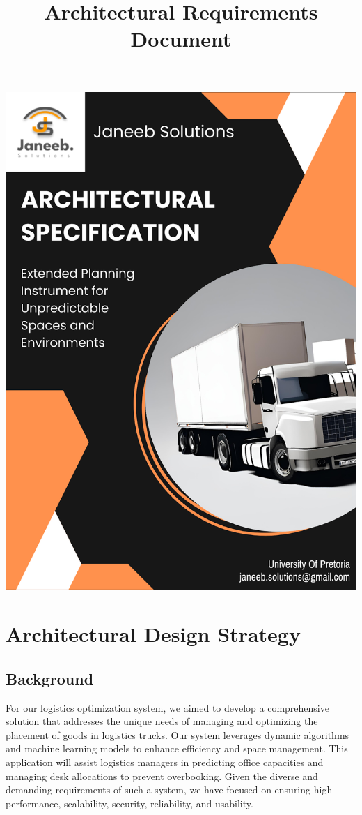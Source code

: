 \documentclass[a4paper,12pt]{article}
\title{Architectural Requirements Document}
\date{}
\begin{document}
\begin{titlepage}
    \centering
    \includegraphics[width=\textwidth]{coverPage.png}
    \vfill
    \maketitle
    \vfill
\end{titlepage}

\tableofcontents
\newpage

\section{Architectural Design Strategy}

\subsection{Background}
For our logistics optimization system, we aimed to develop a comprehensive solution that addresses the unique needs of managing and optimizing the placement of goods in logistics trucks. Our system leverages dynamic algorithms and machine learning models to enhance efficiency and space management. This application will assist logistics managers in predicting office capacities and managing desk allocations to prevent overbooking. Given the diverse and demanding requirements of such a system, we have focused on ensuring high performance, scalability, security, reliability, and usability.
\end{document}
